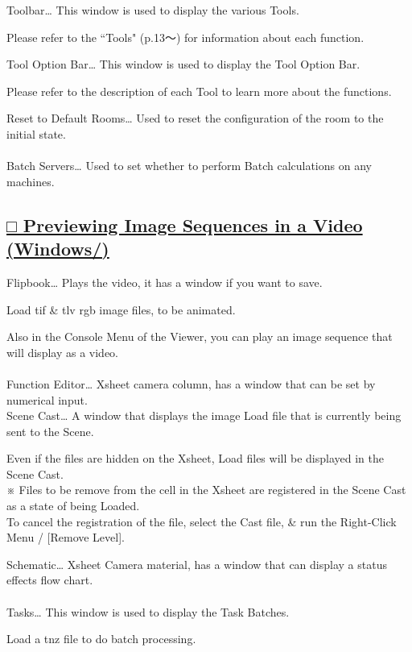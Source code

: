\documentclass[a4paper,10pt]{article}
\begin{document}
\normalsize
\noindent Toolbar… This window is used to display the various Tools.\par
\footnotesize
\noindent Please refer to the “Tools" (p.13～) for information about each function.\\[-0.5em]
\par
\normalsize
\noindent Tool Option Bar… This window is used to display the Tool Option Bar.\par
\footnotesize
\noindent Please refer to the description of each Tool to learn more about the functions.\\[-0.5em]
\par
\normalsize
\noindent Reset to Default Rooms… Used to reset the configuration of the room to the initial state.\\[-0.5em]
\\
Batch Servers… Used to set whether to perform Batch calculations on any machines.

\newpage

\subsection*{\uline{□ Previewing Image Sequences in a Video (Windows/)}}

\normalsize
\noindent Flipbook… Plays the video, it has a window if you want to save.\par
\footnotesize
\noindent Load tif \& tlv rgb image files, to be animated.\\
\par
\normalsize
\noindent Also in the Console Menu of the Viewer, you can play an image sequence that will display as a video.\\
\\
Function Editor… Xsheet camera column, has a window that can be set by numerical input.\\[1em]
Scene Cast… A window that displays the image Load file that is currently being sent to the Scene.\par
\footnotesize
\noindent Even if the files are hidden on the Xsheet, Load files will be displayed in the Scene Cast.\\
※ Files to be remove from the cell in the Xsheet are registered in the Scene Cast as a state of being Loaded.\\
To cancel the registration of the file, select the Cast file, \& run the Right-Click Menu / [Remove Level].\\
\par
\normalsize
\noindent Schematic… Xsheet Camera material, has a window that can display a status effects flow chart.\\
\\
Tasks… This window is used to display the Task Batches.\par
\footnotesize
\noindent Load a tnz file to do batch processing.\\
\\
\end{document}
